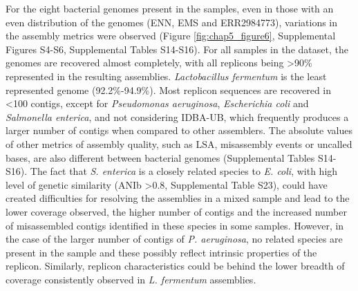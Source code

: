 For the eight bacterial genomes present in the samples, even in those with an even distribution of the genomes (ENN, EMS and ERR2984773), variations in the assembly metrics were observed (Figure \ref{fig:chap5_figure6}, Supplemental Figures S4-S6, Supplemental Tables S14-S16).  For all samples in the dataset, the genomes are recovered almost completely, with all replicons being >90\% represented in the resulting assemblies. \textit{Lactobacillus fermentum} is the least represented genome (92.2\%-94.9\%). Most replicon sequences are recovered in <100 contigs, except for \textit{Pseudomonas aeruginosa}, \textit{Escherichia coli} and \textit{Salmonella enterica}, and not considering IDBA-UB, which frequently produces a larger number of contigs when compared to other assemblers. The absolute values of other metrics of assembly quality, such as \ac{LSA}, misassembly events or uncalled bases, are also different between bacterial genomes (Supplemental Tables S14-S16). The fact that \textit{S. enterica} is a closely related species to \textit{E. coli}, with high level of genetic similarity (ANIb >0.8, Supplemental Table S23), could have created difficulties for resolving the assemblies in a mixed sample and lead to the lower coverage observed, the higher number of contigs and the increased number of misassembled contigs identified in these species in some samples. However, in the case of the larger number of contigs of \textit{P. aeruginosa}, no related species are present in the sample and these possibly reflect intrinsic properties of the replicon. Similarly, replicon characteristics could be behind the lower breadth of coverage consistently observed in \textit{L. fermentum} assemblies. 

